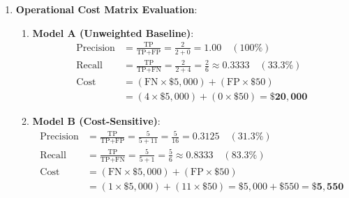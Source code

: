 \begin{enumerate}
\begin{enumerate}[label=(\alph*)]
        \item \textbf{Leakage Mechanism \& Correction}:
        When windowed feature vectors are shuffled randomly, window $k$ may be placed in the training set while adjacent window $k+1$ is placed in the test set. Because they share $75\%$ of the exact same raw physical sensor readings, the test set is no longer independent; the model is evaluated on data it has already seen during training.
        
        \textit{Correction}: Partition the continuous raw sensor stream chronologically into distinct contiguous blocks *before* extracting windows, or insert a purge gap of at least $W = 64$ samples between training and evaluation blocks.
    \end{enumerate}

    \item \textbf{Operational Cost Matrix Evaluation}:
    \begin{enumerate}[label=(\alph*)]
        \item \textbf{Model A (Unweighted Baseline)}:
        \begin{align*}
        \text{Precision} &= \frac{\text{TP}}{\text{TP} + \text{FP}} = \frac{2}{2 + 0} = \mathbf{1.00} \quad (100\%) \\
        \text{Recall} &= \frac{\text{TP}}{\text{TP} + \text{FN}} = \frac{2}{2 + 4} = \frac{2}{6} \approx \mathbf{0.3333} \quad (33.3\%) \\
        \text{Cost} &= (\text{FN} \times \$5{,}000) + (\text{FP} \times \$50) \\
        &= (4 \times \$5{,}000) + (0 \times \$50) = \mathbf{\$20{,}000}
        \end{align*}

        \item \textbf{Model B (Cost-Sensitive)}:
        \begin{align*}
        \text{Precision} &= \frac{\text{TP}}{\text{TP} + \text{FP}} = \frac{5}{5 + 11} = \frac{5}{16} = \mathbf{0.3125} \quad (31.3\%) \\
        \text{Recall} &= \frac{\text{TP}}{\text{TP} + \text{FN}} = \frac{5}{5 + 1} = \frac{5}{6} \approx \mathbf{0.8333} \quad (83.3\%) \\
        \text{Cost} &= (\text{FN} \times \$5{,}000) + (\text{FP} \times \$50) \\
        &= (1 \times \$5{,}000) + (11 \times \$50) = \$5{,}000 + \$550 = \mathbf{\$5{,}550}
        \end{align*}


\end{enumerate}
\end{enumerate}
